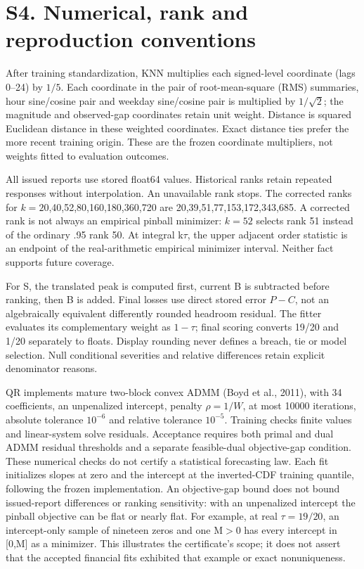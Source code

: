 \documentclass[11pt,a4paper]{article}
\begin{document}
\section*{S4. Numerical, rank and reproduction conventions}
After training standardization, KNN multiplies each signed-level coordinate (lags 0--24) by \(1/5\). Each coordinate in the pair of root-mean-square (RMS) summaries, hour sine/cosine pair and weekday sine/cosine pair is multiplied by \(1/\sqrt2\); the magnitude and observed-gap coordinates retain unit weight. Distance is squared Euclidean distance in these weighted coordinates. Exact distance ties prefer the more recent training origin. These are the frozen coordinate multipliers, not weights fitted to evaluation outcomes.

All issued reports use stored float64 values. Historical ranks retain repeated responses without interpolation. An unavailable rank stops. The corrected ranks for \(k=20\),40,52,80,160,180,360,720 are 20,39,51,77,153,172,343,685. A corrected rank is not always an empirical pinball minimizer: \(k=52\) selects rank 51 instead of the ordinary .95 rank 50. At integral k\(\tau\), the upper adjacent order statistic is an endpoint of the real-arithmetic empirical minimizer interval. Neither fact supports future coverage.

For S, the translated peak is computed first, current B is subtracted before ranking, then B is added. Final losses use direct stored error \(P-C\), not an algebraically equivalent differently rounded headroom residual. The fitter evaluates its complementary weight as \(1-\tau\); final scoring converts 19/20 and 1/20 separately to floats. Display rounding never defines a breach, tie or model selection. Null conditional severities and relative differences retain explicit denominator reasons.

QR implements mature two-block convex ADMM (Boyd et al., 2011), with 34 coefficients, an unpenalized intercept, penalty \(\rho=1/W\), at most 10000 iterations, absolute tolerance \(10^{-6}\) and relative tolerance \(10^{-5}\). Training checks finite values and linear-system solve residuals. Acceptance requires both primal and dual ADMM residual thresholds and a separate feasible-dual objective-gap condition. These numerical checks do not certify a statistical forecasting law. Each fit initializes slopes at zero and the intercept at the inverted-CDF training quantile, following the frozen implementation. An objective-gap bound does not bound issued-report differences or ranking sensitivity: with an unpenalized intercept the pinball objective can be flat or nearly flat. For example, at real \(\tau=19/20\), an intercept-only sample of nineteen zeros and one M\( > \)0 has every intercept in [0,M] as a minimizer. This illustrates the certificate's scope; it does not assert that the accepted financial fits exhibited that example or exact nonuniqueness.
\end{document}
